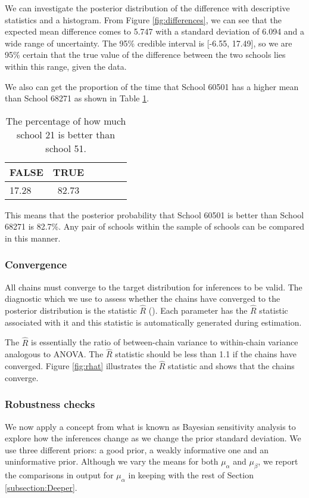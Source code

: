 We can investigate the posterior distribution of the difference with descriptive statistics and a histogram. From Figure \ref{fig:differences}, we can see that the expected mean difference comes to 5.747 with a standard deviation of 6.094 and a wide range of uncertainty. The 95\% credible interval is [-6.55, 17.49], so we are 95\% certain that the true value of the difference between the two schools lies within this range, given the data.

We also can get the proportion of the time that School 60501 has a higher mean than School 68271 as shown in Table \ref{tab:comparison}.

\begin{table}[ht]
	\centering
	\def\arraystretch{1.3}
	{\small
		\begin{tabular}{l | c c c c c}
			FALSE & TRUE \\
			\hline
			17.28 & 82.73
		\end{tabular}
	}
	\caption{{\small The percentage of how much school 21 is better than school 51.}}
	\label{tab:comparison}
\end{table}

This means that the posterior probability that School 60501 is better than School 68271 is 82.7\%. Any pair of schools within the sample of schools can be compared in this manner.

\subsubsection{Convergence}
All chains must converge to the target distribution for inferences to be valid. The diagnostic which we use to assess whether the chains have converged to the posterior distribution is the statistic $\hat{R}$ (\cite{gelman1992inference}). Each parameter has the $\hat{R}$ statistic associated with it and this statistic is automatically generated during estimation.


The $\hat{R}$ is essentially the ratio of between-chain variance to within-chain variance analogous to ANOVA. The $\hat{R}$ statistic should be less than 1.1 if the chains have converged. Figure \ref{fig:rhat} illustrates the $\hat{R}$ statistic and shows that the chains converge.


\subsubsection{Robustness checks}

We now apply a concept from what is known as Bayesian sensitivity analysis to explore how the inferences change as we change the prior standard deviation. We use three different priors: a good prior, a weakly informative one and an uninformative prior. Although we vary the means for both $\mu_{\alpha}$ and $\mu_{\beta}$, we report the comparisons in output for $\mu_{\alpha}$ in keeping with the rest of Section \ref{subsection:Deeper}.

